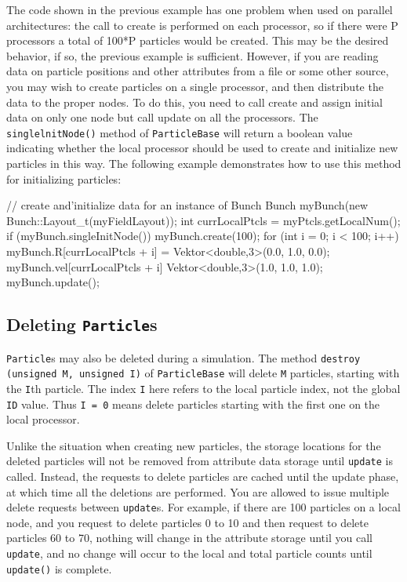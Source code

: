 The code shown in the previous example has one problem when used on parallel architectures: the call to create is performed on each processor, so if there were P processors a total of 100*P particles would be created. This may be the desired behavior, if so, the previous example is sufficient. However, if you are reading data on particle positions and other attributes from a file or some other source, you may wish to create particles on a single processor, and then distribute the
data to the proper nodes. To do this, you need to call create and assign initial data on only one node but call update on all the processors. The \texttt{singlelnitNode()} method of \texttt{ParticleBase} will return a boolean value indicating whether the local processor should be used to create and initialize new particles in this way. The following example demonstrates how to use this method for initializing particles: \\
\begin{code}
// create and'initialize data for an instance of Bunch
Bunch myBunch(new Bunch::Layout\_t(myFieldLayout));
int currLocalPtcls = myPtcls.getLocalNum();
if (myBunch.singleInitNode()) {
    myBunch.create(100);
    for (int i = 0; i < 100; i++) {
        myBunch.R[currLocalPtcls + i] = Vektor<double,3>(0.0, 1.0, 0.0);
        myBunch.vel[currLocalPtcls + i] Vektor<double,3>(1.0, 1.0, 1.0);
    }
}
myBunch.update();
\end{code}


\subsection{Deleting \texttt{Particle}s}

\texttt{Particle}s may also be deleted during a simulation. The method \texttt{destroy (unsigned M, unsigned I)} of \texttt{ParticleBase} will delete \texttt{M} particles, starting with the \texttt{I}th particle. The index \texttt{I} here refers to the local particle index, not the global \texttt{ID} value. Thus \texttt{I = 0} means delete particles starting with the first one on the local processor.

Unlike the situation when creating new particles, the storage locations for the deleted particles will not be removed from attribute data storage until \texttt{update} is called. Instead, the requests to delete particles are cached until the update phase, at which time all the deletions are performed. You are allowed to issue multiple delete requests between \texttt{update}s. For example, if there are 100 particles on a local node, and you request to delete particles 0 to 10
and then request to delete particles 60 to 70, nothing will change in the attribute storage until you call \texttt{update}, and no change will occur to the local and total particle counts until \texttt{update()} is complete.

